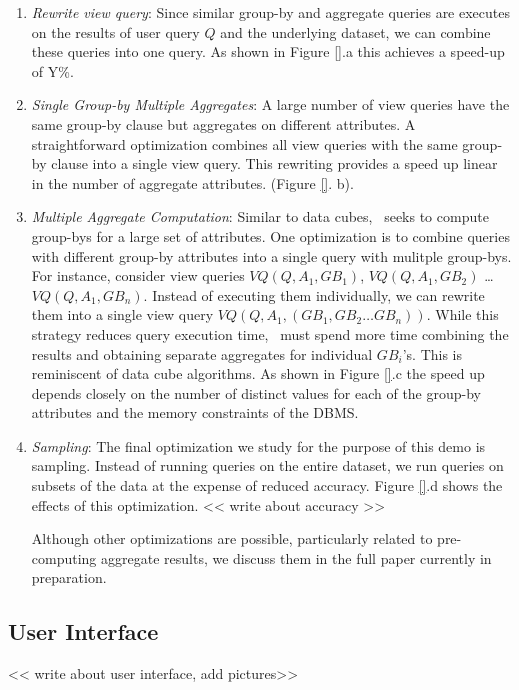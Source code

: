 \begin{enumerate}
  \item {\it Rewrite view query}: Since similar group-by and aggregate queries
  are executes on the results of user query $Q$ and the underlying dataset, we
  can combine these queries into one query. As shown in Figure \ref{}.a this
  achieves a speed-up of Y\%.
  \item {\it Single Group-by Multiple Aggregates}: A large number of view
  queries have the same group-by clause but aggregates on different attributes.
  A straightforward optimization combines all view queries with the same
  group-by clause into a single view query. This rewriting provides a speed up
  linear in the number of aggregate attributes. (Figure \ref{}. b).
  \item {\it Multiple Aggregate Computation}: Similar to data cubes,
  \SeeDB\ seeks to compute group-bys for a large set of attributes. One
  optimization is to combine queries with different group-by attributes into a
  single query with mulitple group-bys. For instance, consider view queries
  $VQ(Q, A_1, GB_1)$, $VQ(Q, A_1, GB_2)$ \ldots $VQ(Q, A_1, GB_n)$. Instead of
  executing them individually, we can rewrite them into a single view query
  $VQ(Q, A_1, (GB_1, GB_2\ldots GB_n))$. While this strategy reduces query
  execution time, \SeeDB\ must spend more time combining the results and
  obtaining separate aggregates for individual $GB_i$'s. This is reminiscent of
  data cube algorithms. As shown in Figure \ref{}.c the speed up depends closely
  on the number of distinct values for each of the group-by attributes and the
  memory constraints of the DBMS.
  \item {\it Sampling}: The final optimization we study for the purpose of this
  demo is sampling. Instead of running queries on the entire dataset, we
  run queries on subsets of the data at the expense of reduced accuracy.
  Figure \ref{}.d shows the effects of this optimization. << write about
  accuracy >>
  
  Although other optimizations are possible, particularly related to
  pre-computing aggregate results, we discuss them in the full paper currently
  in preparation.
\end{enumerate}

\subsection{User Interface}
\label{user_interface}

<< write about user interface, add pictures>>
